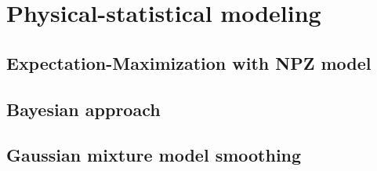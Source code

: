 

\chapter{Physical-statistical modeling}
\label{chapter3}

\section{Expectation-Maximization with NPZ model}


\section{Bayesian approach}


\section{Gaussian mixture model smoothing}